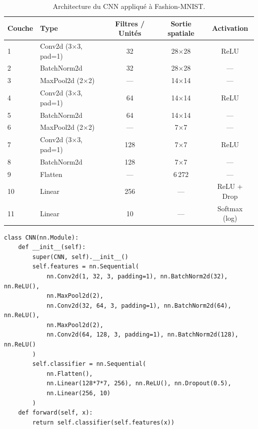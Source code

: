 \documentclass[11pt,a4paper]{article}
\begin{document}
\begin{table}[H]
  \centering
  \caption{Architecture du CNN appliqué à Fashion-MNIST.}
  \label{tab:cnn_archi}
  \begin{tabular}{llccc}
    \toprule
    \textbf{Couche} & \textbf{Type} & \textbf{Filtres / Unités}
                    & \textbf{Sortie spatiale} & \textbf{Activation} \\
    \midrule
    1  & Conv2d (3$\times$3, pad=1) & 32   & 28$\times$28  & ReLU          \\
    2  & BatchNorm2d               & 32   & 28$\times$28  & —             \\
    3  & MaxPool2d (2$\times$2)    & —    & 14$\times$14  & —             \\
    4  & Conv2d (3$\times$3, pad=1)& 64   & 14$\times$14  & ReLU          \\
    5  & BatchNorm2d               & 64   & 14$\times$14  & —             \\
    6  & MaxPool2d (2$\times$2)    & —    & 7$\times$7    & —             \\
    7  & Conv2d (3$\times$3, pad=1)& 128  & 7$\times$7    & ReLU          \\
    8  & BatchNorm2d               & 128  & 7$\times$7    & —             \\
    9  & Flatten                   & —    & 6\,272        & —             \\
    10 & Linear                    & 256  & —             & ReLU + Drop   \\
    11 & Linear                    & 10   & —             & Softmax (log) \\
    \bottomrule
  \end{tabular}
\end{table}

\begin{lstlisting}[caption={Définition du CNN avec \texttt{nn.Module}.},
                   label={lst:cnn_class}]
class CNN(nn.Module):
    def __init__(self):
        super(CNN, self).__init__()
        self.features = nn.Sequential(
            nn.Conv2d(1, 32, 3, padding=1), nn.BatchNorm2d(32), nn.ReLU(),
            nn.MaxPool2d(2),
            nn.Conv2d(32, 64, 3, padding=1), nn.BatchNorm2d(64), nn.ReLU(),
            nn.MaxPool2d(2),
            nn.Conv2d(64, 128, 3, padding=1), nn.BatchNorm2d(128), nn.ReLU()
        )
        self.classifier = nn.Sequential(
            nn.Flatten(),
            nn.Linear(128*7*7, 256), nn.ReLU(), nn.Dropout(0.5),
            nn.Linear(256, 10)
        )
    def forward(self, x):
        return self.classifier(self.features(x))
\end{lstlisting}
\end{document}
